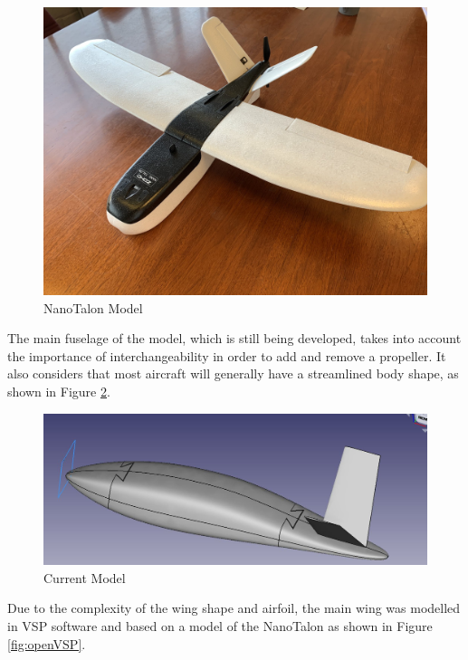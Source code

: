\begin{figure}[H]
    \centering
    \includegraphics[width=0.7\linewidth]{04_Progress/Figs/DwfPl1HWwAA6nSd.png}
    \caption{NanoTalon Model \cite{NanoTalon2}}
    \label{fig:NanoTalon}
\end{figure}

The main fuselage of the model, which is still being developed, takes into account the importance of interchangeability in order to add and remove a propeller. It also considers that most aircraft will generally have a streamlined body shape, as shown in Figure \ref{fig:model}.

\begin{figure}[H]
    \centering
    \includegraphics[width=\linewidth]{04_Progress/Figs/model.JPG}
    \caption{Current Model}
    \label{fig:model}
\end{figure}

Due to the complexity of the wing shape and airfoil, the main wing was modelled in \acrshort{VSP} software and based on a model of the NanoTalon as shown in Figure \ref{fig:openVSP}. 

